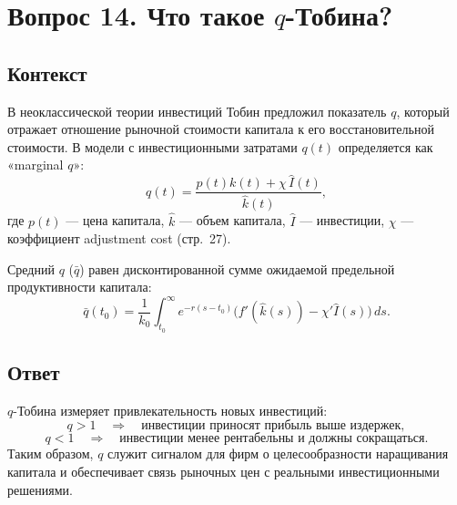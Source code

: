 \section*{Вопрос 14. Что такое \(q\)-Тобина?}

\subsection*{Контекст}
В неоклассической теории инвестиций Тобин предложил показатель \(q\), который отражает отношение рыночной стоимости капитала 
к его восстановительной стоимости. В модели с инвестиционными затратами \(q(t)\) определяется как «marginal \(q\)»:
\[
q(t)=\frac{p(t)k(t)+\chi\,\hat I(t)}{\hat k(t)},
\]
где \(p(t)\) — цена капитала, \(\hat k\) — объем капитала, \(\hat I\) — инвестиции, \(\chi\) — коэффициент adjustment cost (стр.~27).

Средний \(q\) (\(\bar q\)) равен дисконтированной сумме ожидаемой предельной продуктивности капитала:
\[
\bar q(t_0)=\frac1{k_0}\int_{t_0}^{\infty} e^{-r(s-t_0)}\bigl(f'(\hat k(s))-\chi'\hat I(s)\bigr)\,ds.
\]

\subsection*{Ответ}
\(q\)-Тобина измеряет привлекательность новых инвестиций:  
\[
q>1\quad\Rightarrow\quad\text{инвестиции приносят прибыль выше издержек},
\]
\[
q<1\quad\Rightarrow\quad\text{инвестиции менее рентабельны и должны сокращаться}.
\]
Таким образом, \(q\) служит сигналом для фирм о целесообразности наращивания капитала и обеспечивает связь рыночных цен 
с реальными инвестиционными решениями.
